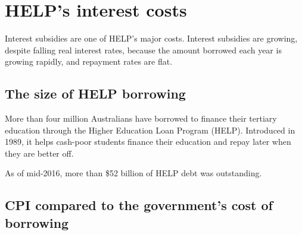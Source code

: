 \documentclass[embargoed]{grattan}
\begin{document}


\chapter[HELP's interest costs]{\gls{HELP}'s interest costs}\label{chap:2-helps-interest-costs}

Interest subsidies are one of \gls{HELP}'s major costs.
Interest subsidies are growing, despite falling real interest rates, because the amount borrowed each year is growing rapidly, and repayment rates are flat.

\section[The size of \gls{HELP} borrowing]{The size of \gls{HELP} borrowing}\label{sec:The size of HELP borrowing}

More than four million Australians have borrowed to finance their tertiary education through the Higher Education Loan Program (\gls{HELP}).
Introduced in 1989, it helps cash-poor students finance their education and repay later when they are better off. 

As of mid-2016, more than \$52 billion of HELP debt was outstanding. 

\section[CPI compared to the government's cost of borrowing]{\gls{CPI} compared to the government's cost of borrowing}\label{sec:cpi-versus-the-governments-cost-of-borrowing}
\end{document}
